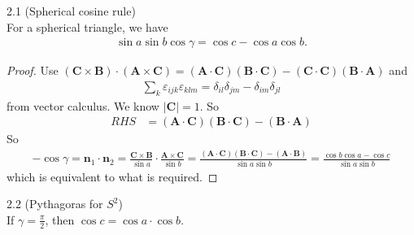 \documentclass[a4paper]{article}
\begin{document}
\begin{thm} 2.1 (Spherical cosine rule) \label{th2.1}\\
For a spherical triangle, we have
\begin{equation*}
\begin{aligned}
\sin a \sin b \cos \gamma = \cos c - \cos a \cos b.
\end{aligned}
\end{equation*}
\begin{proof}
Use $(\mathbf{C} \times \mathbf{B}) \cdot (\mathbf{A} \times \mathbf{C}) = (\mathbf{A} \cdot \mathbf{C}) (\mathbf{B} \cdot \mathbf{C}) - (\mathbf{C} \cdot \mathbf{C}) (\mathbf{B} \cdot \mathbf{A})$ and
\begin{equation*}
\begin{aligned}
\sum_k \varepsilon_{ijk} \varepsilon_{klm} = \delta_{il}\delta_{jm} - \delta_{im}\delta_{jl}
\end{aligned}
\end{equation*}
from vector calculus. We know $|\mathbf{C}| = 1$. So
\begin{equation*}
\begin{aligned}
RHS &= (\mathbf{A} \cdot \mathbf{C})(\mathbf{B} \cdot \mathbf{C}) - (\mathbf{B} \cdot \mathbf{A})
\end{aligned}
\end{equation*}
So
\begin{equation*}
\begin{aligned}
-\cos \gamma = \mathbf{n}_1 \cdot \mathbf{n}_2 = \frac{\mathbf{C} \times \mathbf{B}}{\sin a} \cdot \frac{\mathbf{A} \times \mathbf{C}}{\sin b} = \frac{(\mathbf{A} \cdot \mathbf{C}) (\mathbf{B}\cdot \mathbf{C}) - (\mathbf{A} \cdot \mathbf{B})}{\sin a \sin b} = \frac{\cos b \cos a - \cos c}{\sin a \sin b}
\end{aligned}
\end{equation*}
which is equivalent to what is required.
\end{proof}
\end{thm}

\begin{coro} 2.2 (Pythagoras for $S^2$) \label{th2.2} \\
If $\gamma = \frac{\pi}{2}$, then $\cos c = \cos a \cdot \cos b$.
\end{coro}
\end{document}
